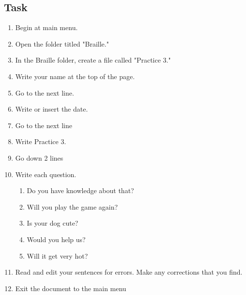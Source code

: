 \documentclass[10pt,letterpaper,twoside]{report}
\begin{document}
{{\subsection{Task}
\begin{enumerate}
	\item Begin at main menu.
	\item Open the folder titled "Braille."
	\item In the Braille folder, create a file called "Practice 3."
	\item Write your name at the top of the page.
	\item Go to the next line.
	\item Write or insert the date.
	\item Go to the next line
	\item Write Practice 3.
	\item Go down 2 lines
	\item Write each question.
	      \begin{enumerate}
		      \item Do you have knowledge about that?
		      \item Will you play the game again?
		      \item Is your dog cute?
		      \item Would you help us?
		      \item Will it get very hot?
	      \end{enumerate}
	\item Read and edit your sentences for errors. Make any corrections that you find.
	\item Exit the document to the main menu
\end{enumerate}

\clearpage
}}
\end{document}
